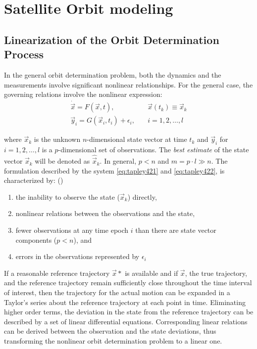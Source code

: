 \chapter{Satellite Orbit modeling}
\label{ch:satellite-orbit-modeling}

\section{Linearization of the Orbit Determination Process}
In the general orbit determination problem, both the dynamics and the measurements 
involve significant nonlinear relationships. For the general case, the governing 
relations involve the nonlinear expression:
\begin{align}
  \label{eq:tapley421}
  \dot{\vec{x}} = F( \vec{x}, t )                 , & \quad \vec{x}(t_k ) \equiv \vec{x}_k \\
  \label{eq:tapley422}
  \vec{y}_i = G( \vec{x}_i , t_i ) + {\epsilon}_i , & \quad  i=1,2,\ldots ,l
\end{align}

where \(\vec{x}_k\) is the unknown \(n\)-dimensional state vector at time \(t_k\) and 
\(\vec{y}_i\) for \(i=1,2,\ldots ,l\) is a \(p\)-dimensional set of observations. The 
\emph{best estimate} of the state vector \(\vec{x}_k\) will be denoted as \(\hat{\vec{x}}_k\). 
In general, \(p<n\) and \( m = p \cdot l \gg n \). The formulation described by the 
system \ref{eq:tapley421} and \ref{eq:tapley422}, is characterized by: (\cite{tapley})
\begin{enumerate}
  \item the inability to observe the state (\(\vec{x}_k\)) directly,
  \item nonlinear relations between the observations and the state, 
  \item fewer observations at any time epoch \(i\) than there are state vector 
  components (\(p<n\)), and 
  \item errors in the observations represented by \({\epsilon}_i\)
\end{enumerate}

If a reasonable reference trajectory \(\vec{x}*\) is available and if 
\(\vec{x}\), the true trajectory, and the reference trajectory remain sufficiently 
close throughout the time interval of interest, then the trajectory for the actual 
motion can be expanded in a Taylor’s series about the reference trajectory at 
each point in time. Eliminating higher order terms, the deviation in the state
from the reference trajectory can be described by a set of linear differential 
equations. Corresponding linear relations can be derived between the observation 
and the state deviations, thus transforming the nonlinear orbit determination problem 
to a linear one.

